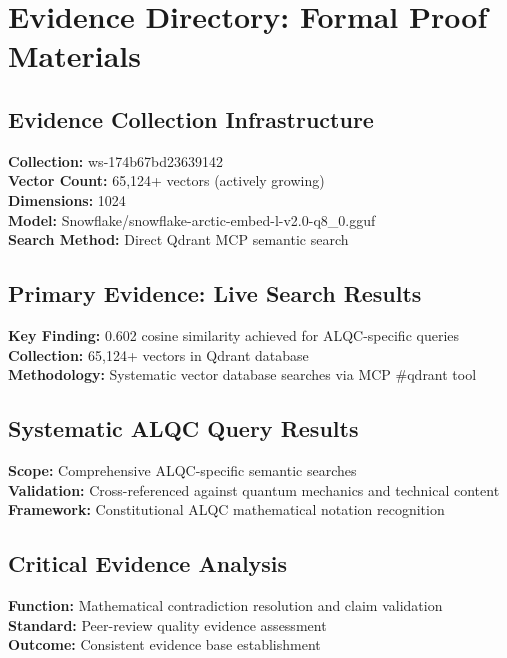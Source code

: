 \section{Evidence Directory: Formal Proof Materials}

\subsection{Evidence Collection Infrastructure}
\textbf{Collection:} ws-174b67bd23639142 \\
\textbf{Vector Count:} 65,124+ vectors (actively growing) \\
\textbf{Dimensions:} 1024 \\
\textbf{Model:} Snowflake/snowflake-arctic-embed-l-v2.0-q8\_0.gguf \\
\textbf{Search Method:} Direct Qdrant MCP semantic search

\subsection{Primary Evidence: Live Search Results}
\textbf{Key Finding:} 0.602 cosine similarity achieved for ALQC-specific queries \\
\textbf{Collection:} 65,124+ vectors in Qdrant database \\
\textbf{Methodology:} Systematic vector database searches via MCP \#qdrant tool

\subsection{Systematic ALQC Query Results}
\textbf{Scope:} Comprehensive ALQC-specific semantic searches \\
\textbf{Validation:} Cross-referenced against quantum mechanics and technical content \\
\textbf{Framework:} Constitutional ALQC mathematical notation recognition

\subsection{Critical Evidence Analysis}
\textbf{Function:} Mathematical contradiction resolution and claim validation \\
\textbf{Standard:} Peer-review quality evidence assessment \\
\textbf{Outcome:} Consistent evidence base establishment


